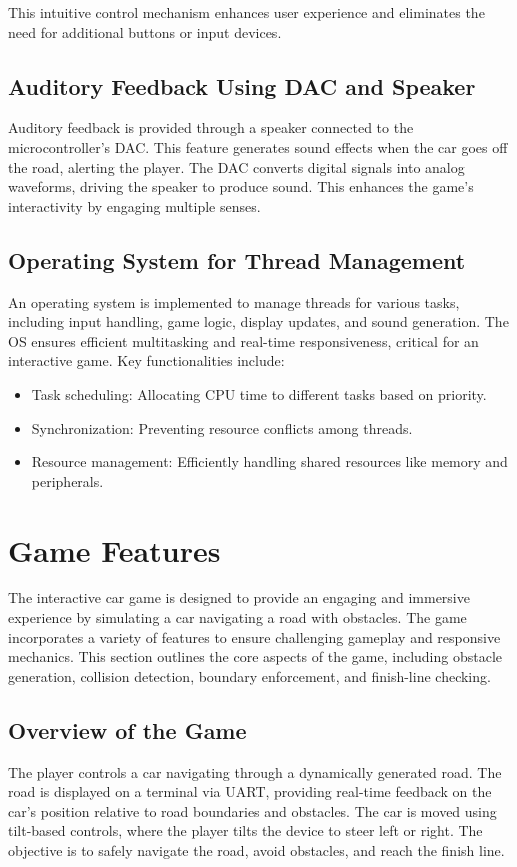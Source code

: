 \documentclass[conference]{IEEEtran}
\begin{document}
This intuitive control mechanism enhances user experience and eliminates the need for additional buttons or input devices.

\subsection{Auditory Feedback Using DAC and Speaker}
Auditory feedback is provided through a speaker connected to the microcontroller's DAC. This feature generates sound effects when the car goes off the road, alerting the player. The DAC converts digital signals into analog waveforms, driving the speaker to produce sound. This enhances the game’s interactivity by engaging multiple senses.

\subsection{Operating System for Thread Management}
An operating system is implemented to manage threads for various tasks, including input handling, game logic, display updates, and sound generation. The OS ensures efficient multitasking and real-time responsiveness, critical for an interactive game. Key functionalities include:
\begin{itemize}
    \item Task scheduling: Allocating CPU time to different tasks based on priority.
    \item Synchronization: Preventing resource conflicts among threads.
    \item Resource management: Efficiently handling shared resources like memory and peripherals.
\end{itemize}

\section{Game Features}
The interactive car game is designed to provide an engaging and immersive experience by simulating a car navigating a road with obstacles. The game incorporates a variety of features to ensure challenging gameplay and responsive mechanics. This section outlines the core aspects of the game, including obstacle generation, collision detection, boundary enforcement, and finish-line checking.

\subsection{Overview of the Game}
The player controls a car navigating through a dynamically generated road. The road is displayed on a terminal via UART, providing real-time feedback on the car's position relative to road boundaries and obstacles. The car is moved using tilt-based controls, where the player tilts the device to steer left or right. The objective is to safely navigate the road, avoid obstacles, and reach the finish line.
\end{document}
